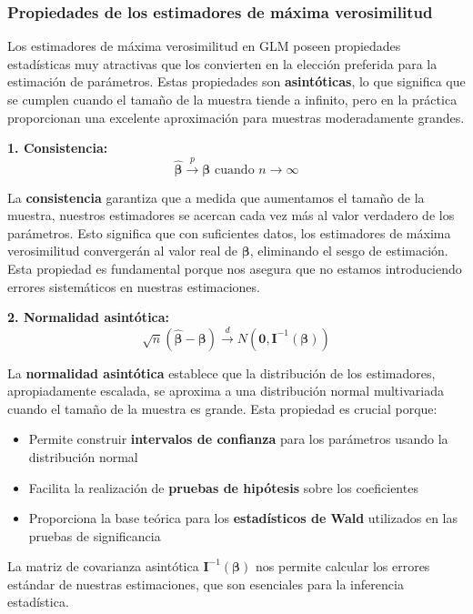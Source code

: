 \documentclass[
  letterpaper,
  DIV=11,
  numbers=noendperiod]{scrreprt}
\providecommand{\tightlist}{%
  \setlength{\itemsep}{0pt}\setlength{\parskip}{0pt}}
\begin{document}
\subsubsection{Propiedades de los estimadores de máxima
verosimilitud}\label{propiedades-de-los-estimadores-de-muxe1xima-verosimilitud}

Los estimadores de máxima verosimilitud en GLM poseen propiedades
estadísticas muy atractivas que los convierten en la elección preferida
para la estimación de parámetros. Estas propiedades son
\textbf{asintóticas}, lo que significa que se cumplen cuando el tamaño
de la muestra tiende a infinito, pero en la práctica proporcionan una
excelente aproximación para muestras moderadamente grandes.

\textbf{1. Consistencia:}
\[\hat{\boldsymbol{\beta}} \xrightarrow{p} \boldsymbol{\beta} \text{ cuando } n \to \infty\]

La \textbf{consistencia} garantiza que a medida que aumentamos el tamaño
de la muestra, nuestros estimadores se acercan cada vez más al valor
verdadero de los parámetros. Esto significa que con suficientes datos,
los estimadores de máxima verosimilitud convergerán al valor real de
\(\boldsymbol{\beta}\), eliminando el sesgo de estimación. Esta
propiedad es fundamental porque nos asegura que no estamos introduciendo
errores sistemáticos en nuestras estimaciones.

\textbf{2. Normalidad asintótica:}
\[\sqrt{n}(\hat{\boldsymbol{\beta}} - \boldsymbol{\beta}) \xrightarrow{d} N(\mathbf{0}, \mathbf{I}^{-1}(\boldsymbol{\beta}))\]

La \textbf{normalidad asintótica} establece que la distribución de los
estimadores, apropiadamente escalada, se aproxima a una distribución
normal multivariada cuando el tamaño de la muestra es grande. Esta
propiedad es crucial porque:

\begin{itemize}
\tightlist
\item
  Permite construir \textbf{intervalos de confianza} para los parámetros
  usando la distribución normal
\item
  Facilita la realización de \textbf{pruebas de hipótesis} sobre los
  coeficientes
\item
  Proporciona la base teórica para los \textbf{estadísticos de Wald}
  utilizados en las pruebas de significancia
\end{itemize}

La matriz de covarianza asintótica
\(\mathbf{I}^{-1}(\boldsymbol{\beta})\) nos permite calcular los errores
estándar de nuestras estimaciones, que son esenciales para la inferencia
estadística.
\end{document}
